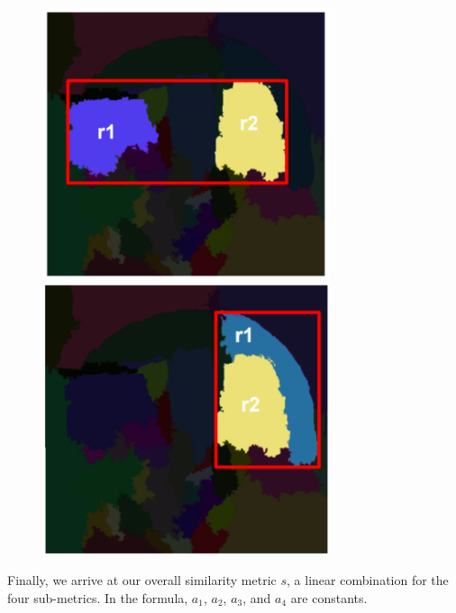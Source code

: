 \documentclass{article}
\begin{document}
\begin{figure}[htbp]
    \centering
    \begin{minipage}{0.45\textwidth}
        \centering
        \includegraphics[width=0.75\textwidth]{bb1.PNG} %
    \end{minipage}\hfill
    \begin{minipage}{0.45\textwidth}
        \centering
        \includegraphics[width=0.75\textwidth]{bb2.PNG} %
    \end{minipage}
\end{figure}

Finally, we arrive at our overall similarity metric $s$, a linear combination for the four sub-metrics. In the formula, $a_1$, $a_2$, $a_3$, and $a_4$ are constants.
\end{document}
